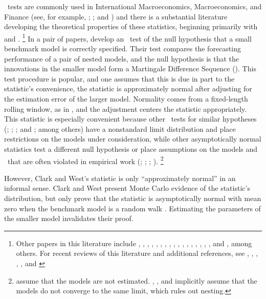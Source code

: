\documentclass[12pt,fleqn]{article}
\begin{document}
\oos\ tests are commonly used in International Macroeconomics,
Macroeconomics, and Finance (see, for example, \citealt{MeR:83};
\citealt{StW:03}; and \citealt{GoW:08}) and there is a substantial
literature developing the theoretical properties of these statistics,
beginning primarily with \citet{DiM:95} and
\citet{Wes:96}.%
\footnote{Other papers in this literature include
  \citet{WeM:98}, \citet{Mcc:98,Mcc:00},
  \citet{ClM:01,ClM:05-2,ClM:05,ClM:11b,ClM:12,ClM:12b},
  \citet{CCS:01}, \citet{CoS:02,CoS:04,CoS:07}, \citet{Whi:00},
  \citet{InK:04,InK:06}, \citet{Han:05}, \citet{Ros:05},
  \citet{ClW:06,ClW:07}, \citet{Ana:07}, \citet{GiR:09,GiR:10},
  \citet{HuW:10}, \citet{HLN:11}, \cite{InR:11}, \cite{Pin:11},
  \cite{RoS:11,RoS:11b}, and \citet{Cal:11}, among others.  For recent
  reviews of this literature and additional references, see
  \citet{McW:02}, \citet{CoS:06}, \citet{Wes:06}, \citet{ClM:11c},
  \citet{CoD:11}, and \citet{Gia:11}} %
In a pair of papers,
\citet{ClW:06,ClW:07} develop an \oos\ test of the null hypothesis
that a small benchmark model is correctly specified.  Their test
compares the forecasting performance of a pair of nested models, and
the null hypothesis is that the innovations in the smaller model form
a Martingale Difference Sequence (\mds).  This test procedure is popular, and
one assumes that this is due in part to the statistic's convenience,
the statistic is approximately normal after adjusting for the
estimation error of the larger model.  Normality comes from a
fixed-length rolling window, as in \citet{GiW:06}, and the adjustment
centers the statistic appropriately.  This statistic is especially
convenient because other \oos\ tests for similar hypotheses
(\citealt{CCS:01}; \citealt{ClM:01,ClM:05}; \citealt{CoS:02,CoS:04};
and \citealt{Mcc:07}; among others) have a nonstandard limit
distribution and place restrictions on the models under consideration,
while other asymptotically normal statistics test a different null
hypothesis \citep{GiW:06} or place assumptions on the models and \dgp\
that are often violated in empirical work (\citealt{DiM:95};
\citealt{Wes:96}; \citealt{WeM:98};
\citealt{Mcc:00}).%
\footnote{\citet{DiM:95} assume that the models are
  not estimated. \citet{Wes:96}, \citet{WeM:98}, and \citet{Mcc:00}
  implicitly assume that the models do not converge to the same limit,
  which rules out nesting.} %

However, Clark and West's statistic is only ``approximately normal''
in an informal sense.  Clark and West present Monte Carlo evidence of
the statistic's distribution, but only prove that the statistic is
asymptotically normal with mean zero when the benchmark model is a
random walk \citep{ClW:06}. Estimating the parameters of the smaller
model invalidates their proof.
\end{document}
